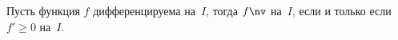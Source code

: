 
    Пусть функция $f$ дифференцируема на~$I$, тогда $f\nv$ на~$I$, если и только если $f'\geq0$ на~$I$.
